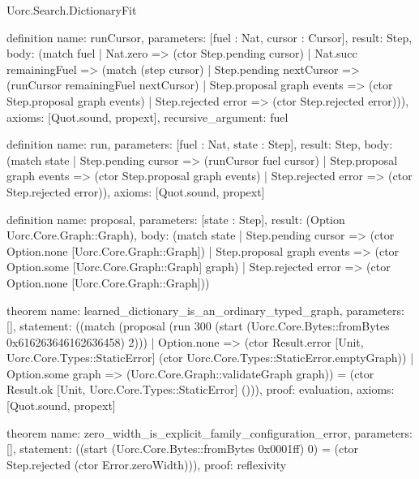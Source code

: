 \begin{lexlean}{Uorc.Search.DictionaryFit}
\begin{semanticmodule}
definition{
  name: runCursor,
  parameters: [fuel : Nat, cursor : Cursor],
  result: Step,
  body: (match fuel
    | Nat.zero => (ctor Step.pending cursor)
    | Nat.succ remainingFuel => (match (step cursor)
      | Step.pending nextCursor => (runCursor remainingFuel nextCursor)
      | Step.proposal graph events => (ctor Step.proposal graph events)
      | Step.rejected error => (ctor Step.rejected error))),
  axioms: [Quot.sound, propext],
  recursive_argument: fuel
}

definition{
  name: run,
  parameters: [fuel : Nat, state : Step],
  result: Step,
  body: (match state
    | Step.pending cursor => (runCursor fuel cursor)
    | Step.proposal graph events => (ctor Step.proposal graph events)
    | Step.rejected error => (ctor Step.rejected error)),
  axioms: [Quot.sound, propext]
}

definition{
  name: proposal,
  parameters: [state : Step],
  result: (Option Uorc.Core.Graph::Graph),
  body: (match state
    | Step.pending cursor => (ctor Option.none [Uorc.Core.Graph::Graph])
    | Step.proposal graph events => (ctor Option.some [Uorc.Core.Graph::Graph] graph)
    | Step.rejected error => (ctor Option.none [Uorc.Core.Graph::Graph]))
}

theorem{
  name: learned_dictionary_is_an_ordinary_typed_graph,
  parameters: [],
  statement: ((match (proposal (run 300 (start (Uorc.Core.Bytes::fromBytes 0x616263646162636458) 2)))
    | Option.none => (ctor Result.error [Unit, Uorc.Core.Types::StaticError] (ctor Uorc.Core.Types::StaticError.emptyGraph))
    | Option.some graph => (Uorc.Core.Graph::validateGraph graph)) = (ctor Result.ok [Unit, Uorc.Core.Types::StaticError] ())),
  proof: evaluation{},
  axioms: [Quot.sound, propext]
}

theorem{
  name: zero_width_is_explicit_family_configuration_error,
  parameters: [],
  statement: ((start (Uorc.Core.Bytes::fromBytes 0x0001ff) 0) = (ctor Step.rejected (ctor Error.zeroWidth))),
  proof: reflexivity{}
}
\end{semanticmodule}
\end{lexlean}
